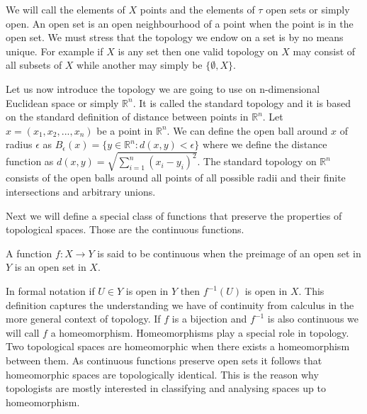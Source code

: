 We will call the elements of $X$ points and the elements of $\tau$ open sets or simply open. An open set is an open neighbourhood of a point when the point is in the open set. We must stress that the topology we endow on a set is by no means unique. For example if $X$ is any set then one valid topology on $X$ may consist of all subsets of $X$ while another may simply be $\{\emptyset, X\}$.

Let us now introduce the topology we are going to use on n-dimensional Euclidean space or simply $\mathbb{R}^n$. It is called the standard topology and it is based on the standard definition of distance between points in $\mathbb{R}^n$. Let $x = (x_1, x_2, ..., x_n)$ be a point in $\mathbb{R}^n$. We can define the open ball around $x$ of radius $\epsilon$ as $B_\epsilon(x) = \{y \in \mathbb{R}^n: d(x, y) < \epsilon\}$ where we define the distance function as $d(x, y) = \sqrt{\sum_{i=1}^n{(x_i - y_i)^2}}$. The standard topology on $\mathbb{R}^n$ consists of the open balls around all points of all possible radii and their finite intersections and arbitrary unions.


Next we will define a special class of functions that preserve the properties of topological spaces. Those are the continuous functions.

\begin{defn} A function $f : X \to Y$ is said to be continuous when the preimage of an open set in $Y$ is an open set in $X$. \end{defn}

In formal notation if $U \in Y$ is open in $Y$ then $f^{-1}(U)$ is open in $X$. This definition captures the understanding we have of continuity from calculus in the more general context of topology. If $f$ is a bijection and $f^{-1}$ is also continuous we will call $f$ a homeomorphism. Homeomorphisms play a special role in topology. Two topological spaces are homeomorphic when there exists a homeomorphism between them. As continuous functions preserve open sets it follows that homeomorphic spaces are topologically identical. This is the reason why topologists are mostly interested in classifying and analysing spaces up to homeomorphism.




